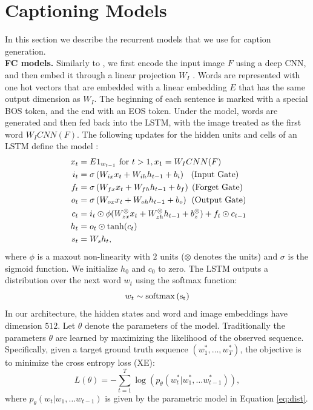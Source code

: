\documentclass[10pt,twocolumn,letterpaper]{article}
\begin{document}
\section{Captioning Models} \label{sec:captioner}

In this section we describe the recurrent models that we use for caption generation.\\

\noindent \textbf{FC models.} Similarly to \cite{GoogleNIC,KarpathyF14}, we first encode the input image $F$ using a deep CNN, and then embed it through a linear projection $W_{I}$ . Words are represented with one hot vectors that are embedded with a linear embedding $E$ that has the same output dimension as $W_{I}$.
The beginning of each sentence is marked with a special BOS token, and the end with an EOS token.
Under the model, words are generated and then fed back into the LSTM, with the image treated as the first word $W_{I} CNN(F)$. The following updates for the hidden units and cells of an LSTM define the model \cite{HochreiterLSTM}:\vspace{-0.1in} 
 \begin{align*}
x_{t}&=E 1_{w_{t-1}} \text{ for } t >1, x_1=W_{I} CNN(F)\\ 
i_{t}&= \sigma\left(W_{ix} x_{t}+W_{ih}h_{t-1}+ b_{i}\right) \;\;\, (\text {Input Gate})\\
f_{t}&=\sigma\left(W_{fx} x_{t}+W_{fh}h_{t-1}+ b_{f}\right) \; (\text {Forget Gate})\\\
o_{t}&=\sigma\left(W_{ox} x_{t}+W_{oh}h_{t-1}+ b_{o}\right) \;\, (\text {Output Gate})\\
c_{t}&= i_{t}\odot \phi(W^{\otimes}_{zx} x_{t}+W_{zh}^{\otimes}h_{t-1}+ b_{z}^{\otimes})+ f_{t}\odot c_{t-1} \\
h_t &= o_t \odot \tanh(c_{t}) \\
s_{t}&= W_{s} h_{t},
\vspace{-0.1in} 
\end{align*}
where $\phi$ is a maxout non-linearity with $2$ units ($\otimes$ denotes the units) and $\sigma$ is the sigmoid function. We initialize $h_0$ and $c_0$ to zero.  
The LSTM outputs a distribution over the next word $w_{t}$ using the softmax function:
\begin{equation}
w_{t}\sim \rm{softmax}\left(s_{t} \right)
\label{eq:dist}
\end{equation}
In our architecture, the hidden states and word and image embeddings have dimension $512$. 
Let $\theta$ denote the parameters of the model. Traditionally the parameters $\theta$ are learned by maximizing the likelihood of the observed sequence. 
Specifically, given a target ground truth sequence $(w^*_{1},\dots, w^*_{T})$, the objective is to minimize the cross entropy loss (XE):
\vspace{-0.12in}
\begin{equation}
L(\theta)=-\sum_{t=1}^{T} \log (p_{\theta}(w^*_{t}|w^*_{1},\dots w^*_{t-1})),
\label{eq:xent}
\end{equation}
where $p_{\theta}(w_t|w_1,\dots w_{t-1})$ is given by the parametric model in Equation \eqref{eq:dist}.\\
\end{document}
